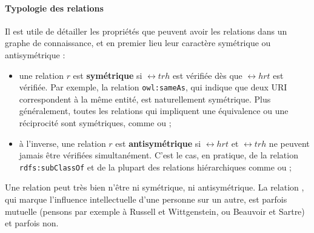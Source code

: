 \paragraph{Typologie des relations} 

Il est utile de détailler les propriétés que peuvent avoir les relations dans un graphe de connaissance, et en premier lieu leur caractère symétrique ou antisymétrique :
\begin{itemize}
    \item une relation $r$ est \textbf{symétrique} si $\rel{t}{r}{h}$ est vérifiée dès que $\rel{h}{r}{t}$ est vérifiée. Par exemple, la relation \texttt{owl:sameAs}, qui indique que deux URI correspondent à la même entité, est naturellement symétrique. Plus généralement, toutes les relations qui impliquent une équivalence ou une réciprocité sont symétriques, comme  ou ;
    \item à l'inverse, une relation $r$ est \textbf{antisymétrique} si $\rel{h}{r}{t}$ et $\rel{t}{r}{h}$ ne peuvent jamais être vérifiées simultanément. C'est le cas, en pratique, de la relation \texttt{rdfs:subClassOf} et de la plupart des relations hiérarchiques comme  ou ;
\end{itemize}
Une relation peut très bien n'être ni symétrique, ni antisymétrique. La relation , qui marque l'influence intellectuelle d'une personne sur un autre, est parfois mutuelle (pensons par exemple à Russell et Wittgenstein, ou Beauvoir et Sartre) et parfois non.

